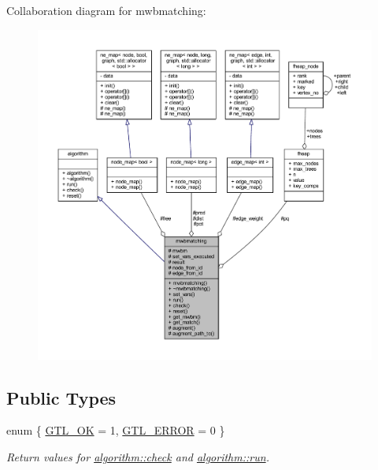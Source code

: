Collaboration diagram for mwbmatching\+:\nopagebreak
\begin{figure}[H]
\begin{center}
\leavevmode
\includegraphics[width=350pt]{classmwbmatching__coll__graph}
\end{center}
\end{figure}
\subsection*{Public Types}
\begin{DoxyCompactItemize}
\item 
enum \{ \mbox{\hyperlink{classalgorithm_af1a0078e153aa99c24f9bdf0d97f6710a5114c20e4a96a76b5de9f28bf15e282b}{G\+T\+L\+\_\+\+OK}} = 1, 
\mbox{\hyperlink{classalgorithm_af1a0078e153aa99c24f9bdf0d97f6710a6fcf574690bbd6cf710837a169510dd7}{G\+T\+L\+\_\+\+E\+R\+R\+OR}} = 0
 \}
\begin{DoxyCompactList}\small\item\em Return values for \mbox{\hyperlink{classalgorithm_a76361fb03ad1cf643affc51821e43bed}{algorithm\+::check}} and \mbox{\hyperlink{classalgorithm_a734b189509a8d6b56b65f8ff772d43ca}{algorithm\+::run}}. \end{DoxyCompactList}\end{DoxyCompactItemize}
